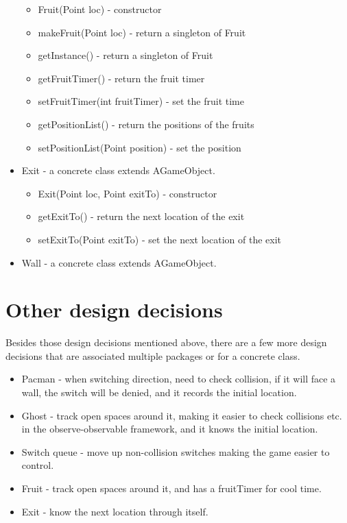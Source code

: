 \documentclass[letterpaper, 11pt]{article}
\begin{document}
\begin{itemize}
\begin{itemize}
  \item Fruit(Point loc) - constructor
  \item makeFruit(Point loc) - return a singleton of Fruit
  \item getInstance() - return a singleton of Fruit
  \item getFruitTimer() - return the fruit timer
  \item setFruitTimer(int fruitTimer) - set the fruit time
  \item getPositionList() - return the positions of the fruits
  \item setPositionList(Point position) - set the position
  \end{itemize}
  \item Exit - a concrete class extends AGameObject.
  \begin{itemize}
  \item Exit(Point loc, Point exitTo) - constructor
  \item getExitTo() - return the next location of the exit
  \item setExitTo(Point exitTo) - set the next location of the exit
  \end{itemize}
  \item Wall - a concrete class extends AGameObject.
  \fi
    
\end{itemize}

\section{Other design decisions}
Besides those design decisions mentioned above, there are a few more design decisions that are associated multiple packages or for a concrete class. 
\begin{itemize}
\item Pacman - when switching direction, need to check collision, if it will face a wall, the switch will be denied, and it records the initial location.
\item Ghost - track open spaces around it, making it easier to check collisions etc. in the observe-observable framework, and it knows the initial location.
\item Switch queue - move up non-collision switches making the game easier to control.
\item Fruit - track open spaces around it, and has a fruitTimer for cool time.
\item Exit - know the next location through itself.
\end{itemize}
\end{document}
